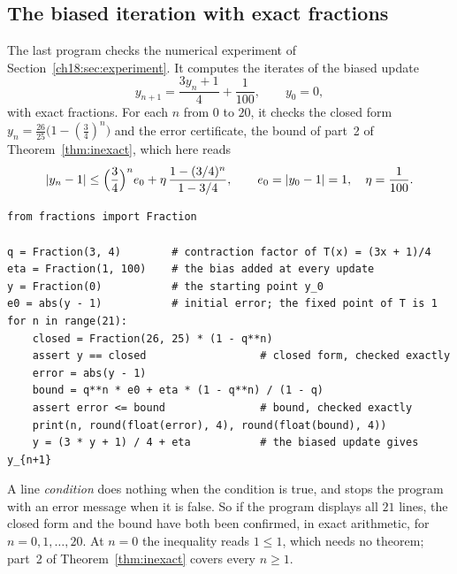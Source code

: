 \subsection*{The biased iteration with exact fractions}
The last program checks the numerical experiment of Section~\ref{ch18:sec:experiment}. It computes the iterates of the biased update
\[
y_{n+1}=\frac{3y_n+1}{4}+\frac1{100},\qquad y_0=0,
\]
with exact fractions. For each $n$ from $0$ to $20$, it checks the closed form $y_n=\frac{26}{25}\bigl(1-(\frac34)^n\bigr)$ and the error certificate, the bound of part~2 of Theorem~\ref{thm:inexact}, which here reads
\[
\left|y_n-1\right|\le\Bigl(\frac34\Bigr)^n e_0+\eta\,\frac{1-(3/4)^n}{1-3/4},
\qquad e_0=\left|y_0-1\right|=1,\quad \eta=\frac1{100}.
\]
\begin{lstlisting}
from fractions import Fraction

q = Fraction(3, 4)        # contraction factor of T(x) = (3x + 1)/4
eta = Fraction(1, 100)    # the bias added at every update
y = Fraction(0)           # the starting point y_0
e0 = abs(y - 1)           # initial error; the fixed point of T is 1
for n in range(21):
    closed = Fraction(26, 25) * (1 - q**n)
    assert y == closed                  # closed form, checked exactly
    error = abs(y - 1)
    bound = q**n * e0 + eta * (1 - q**n) / (1 - q)
    assert error <= bound               # bound, checked exactly
    print(n, round(float(error), 4), round(float(bound), 4))
    y = (3 * y + 1) / 4 + eta           # the biased update gives y_{n+1}
\end{lstlisting}
A line  \emph{condition} does nothing when the condition is true, and stops the program with an error message when it is false. So if the program displays all $21$ lines, the closed form and the bound have both been confirmed, in exact arithmetic, for $n=0,1,\ldots,20$. At $n=0$ the inequality reads $1\le1$, which needs no theorem; part~2 of Theorem~\ref{thm:inexact} covers every $n\ge1$.

